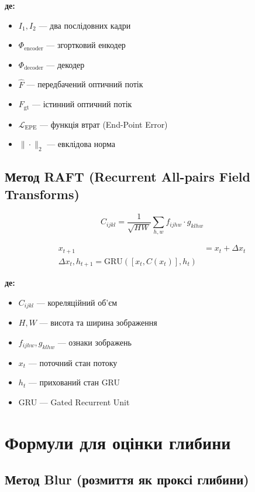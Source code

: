 \documentclass[14pt, a4paper]{extarticle}
\numberwithin{equation}{section}
\begin{document}
\textbf{де:}
\begin{itemize}
\item $I_1, I_2$ — два послідовних кадри
\item $\Phi_{\text{encoder}}$ — згортковий енкодер
\item $\Phi_{\text{decoder}}$ — декодер
\item $\hat{F}$ — передбачений оптичний потік
\item $F_{\text{gt}}$ — істинний оптичний потік
\item $\mathcal{L}_{\text{EPE}}$ — функція втрат (End-Point Error)
\item $\|\cdot\|_2$ — евклідова норма
\end{itemize}

\subsection{Метод RAFT (Recurrent All-pairs Field Transforms)}

\begin{equation}
\boxed{C_{ijkl} = \frac{1}{\sqrt{HW}} \sum_{h,w} f_{ijhw} \cdot g_{klhw}} \tag{19}
\end{equation}

\begin{align}
x_{t+1} &= x_t + \Delta x_t \tag{20} \\
\boxed{\Delta x_t, h_{t+1} = \text{GRU}([x_t, C(x_t)], h_t)} \tag{21}
\end{align}

\textbf{де:}
\begin{itemize}
\item $C_{ijkl}$ — кореляційний об'єм
\item $H, W$ — висота та ширина зображення
\item $f_{ijhw}, g_{klhw}$ — ознаки зображень
\item $x_t$ — поточний стан потоку
\item $h_t$ — прихований стан GRU
\item GRU — Gated Recurrent Unit
\end{itemize}

\newpage

\section{Формули для оцінки глибини}

\subsection{Метод Blur (розмиття як проксі глибини)}
\end{document}
